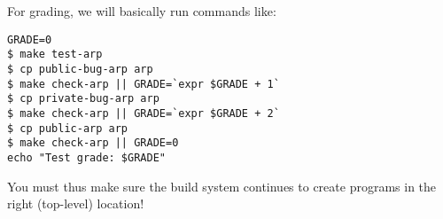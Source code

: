 \documentclass{article}
\begin{document}
For grading, we will basically run commands like:
\begin{verbatim}
GRADE=0
$ make test-arp
$ cp public-bug-arp arp
$ make check-arp || GRADE=`expr $GRADE + 1`
$ cp private-bug-arp arp
$ make check-arp || GRADE=`expr $GRADE + 2`
$ cp public-arp arp
$ make check-arp || GRADE=0
echo "Test grade: $GRADE"
\end{verbatim}
You must thus make sure the build system continues to create programs in the
right (top-level) location!
\end{document}
